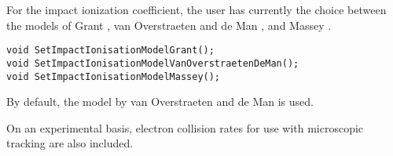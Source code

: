 For the impact ionization coefficient, the user has currently the choice 
between the models of Grant \cite{Grant1973},
van Overstraeten and de Man \cite{VanOverstraeten1970}, and Massey 
\cite{Massey2006}.
\begin{lstlisting}
void SetImpactIonisationModelGrant();
void SetImpactIonisationModelVanOverstraetenDeMan();
void SetImpactIonisationModelMassey();
\end{lstlisting}
By default, the model by van Overstraeten and de Man is used.

On an experimental basis, electron collision rates for use with microscopic tracking 
are also included. 
